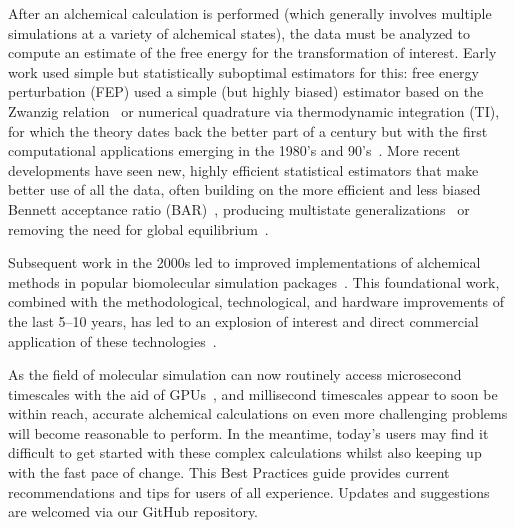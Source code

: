 \documentclass[9pt,bestpractices]{livecoms}
\begin{document}
After an alchemical calculation is performed (which generally involves multiple simulations at a variety of alchemical states), the data must be analyzed to compute an estimate of the free energy for the transformation of interest.
 Early work used simple but statistically suboptimal estimators for this: free energy perturbation (FEP) used a simple (but highly biased) estimator based on the Zwanzig relation~\cite{zwanzig1954hightemperature} or numerical quadrature via thermodynamic integration (TI), for which the theory dates back the better part of a century but with the first computational applications emerging in the 1980's and 90's~\cite{kirkwood1935statistical, jorgensen1985monte, kollman1993free, wong1986dynamicsa, merz1989free}. %
 More recent developments have seen new, highly efficient statistical estimators that make better use of all the data, often building on the more efficient and less biased Bennett acceptance ratio (BAR)~\cite{bennett1976efficient}, producing multistate generalizations~\cite{shirts2008statisticallya} or removing the need for global equilibrium~\cite{wu2016multiensemble, mey2014xtram, wu2014statistically}.

Subsequent work in the 2000s led to improved implementations of alchemical methods in popular biomolecular simulation packages~\cite{shirts2003extremely,shirts2005solvation,vanderspoel2005gromacs, mermelstein2018fast, wang2015accurate, hedges2019biosimspace, riniker2011calculation}. 
 This foundational work, combined with the methodological, technological, and hardware improvements of the last 5--10 years, has led to an explosion of interest and direct commercial application of these technologies~\cite{wang2015accurate, fratev2019improved, schindler2020largescale, cournia2017relative, sherborne2016collaborating, kuhn2020assessment}.


As the field of molecular simulation can now routinely access microsecond timescales with the aid of GPUs~\cite{salomon-ferrer2013routine}, and millisecond timescales appear to soon be within reach, accurate alchemical calculations on even more challenging problems will become reasonable to perform. 
In the meantime, today's users may find it difficult to get started with these complex calculations whilst also keeping up with the fast pace of change. 
This Best Practices guide provides current recommendations and tips for users of all experience. Updates and suggestions are welcomed via our GitHub repository.    
\end{document}
